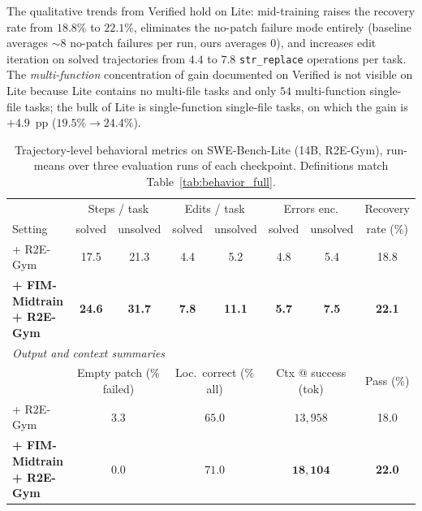 The qualitative trends from Verified hold on Lite: mid-training raises
the recovery rate from $18.8\%$ to $22.1\%$, eliminates the no-patch
failure mode entirely (baseline averages $\sim\!8$ no-patch failures
per run, ours averages $0$), and increases edit iteration on solved
trajectories from $4.4$ to $7.8$ \texttt{str\_replace} operations per
task. The \emph{multi-function} concentration of gain documented on
Verified is not visible on Lite because Lite contains no multi-file
tasks and only $54$ multi-function single-file tasks; the bulk of Lite
is single-function single-file tasks, on which the gain is
$+4.9$~pp ($19.5\%\!\to\!24.4\%$).

\begin{table}[h]
\centering
\caption{Trajectory-level behavioral metrics on SWE-Bench-Lite (14B,
R2E-Gym), run-means over three evaluation runs of each checkpoint.
Definitions match Table~\ref{tab:behavior_full}.}
\label{tab:behavior_lite}
\small
\setlength{\tabcolsep}{4pt}
\begin{tabular}{l c c c c c c c}
\toprule
& \multicolumn{2}{c}{Steps / task}
& \multicolumn{2}{c}{Edits / task}
& \multicolumn{2}{c}{Errors enc.}
& Recovery \\
\cmidrule(lr){2-3}\cmidrule(lr){4-5}\cmidrule(lr){6-7}
Setting & solved & unsolved & solved & unsolved & solved & unsolved & rate (\%) \\
\midrule
+ R2E-Gym
  & 17.5 & 21.3 & 4.4 & 5.2 & 4.8 & 5.4 & 18.8 \\
\textbf{+ FIM-Midtrain + R2E-Gym}
  & \textbf{24.6} & \textbf{31.7} & \textbf{7.8} & \textbf{11.1}
  & \textbf{5.7} & \textbf{7.5} & \textbf{22.1} \\
\midrule
\multicolumn{8}{l}{\textit{Output and context summaries}} \\
\midrule
& \multicolumn{2}{c}{Empty patch (\% failed)}
& \multicolumn{2}{c}{Loc.\ correct (\% all)}
& \multicolumn{2}{c}{Ctx @ success (tok)}
& Pass (\%) \\
\cmidrule(lr){2-3}\cmidrule(lr){4-5}\cmidrule(lr){6-7}
+ R2E-Gym
  & \multicolumn{2}{c}{$3.3$} & \multicolumn{2}{c}{$65.0$}
  & \multicolumn{2}{c}{$13{,}958$} & 18.0 \\
\textbf{+ FIM-Midtrain + R2E-Gym}
  & \multicolumn{2}{c}{$\mathbf{0.0}$} & \multicolumn{2}{c}{$\mathbf{71.0}$}
  & \multicolumn{2}{c}{$\mathbf{18{,}104}$} & \textbf{22.0} \\
\bottomrule
\end{tabular}
\end{table}

